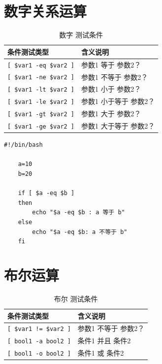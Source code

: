 \documentclass[UTF8,a4paper,12pt]{ctexbook}
\begin{document}
		 \section{数字关系运算}
			\begin{table}[H]
				\centering
				\caption{数字 测试条件}
				\begin{tabular}{p{5cm}<{\centering} | p{10cm}<{\centering}}
					\toprule
						条件测试类型 & 含义说明\\
					\midrule
						\verb|[ $var1 -eq $var2 ]| & 参数1 等于 参数2？\\
						\verb|[ $var1 -ne $var2 ]| & 参数1 不等于 参数2？\\
						\verb|[ $var1 -lt $var2 ]| & 参数1 小于 参数2？\\
						\verb|[ $var1 -le $var2 ]| & 参数1 小于等于 参数2？\\
						\verb|[ $var1 -gt $var2 ]| & 参数1 大于 参数2？\\
						\verb|[ $var1 -ge $var2 ]| & 参数1 大于等于 参数2？\\
					\bottomrule
				\end{tabular}
			\end{table}
					 
			 \begin{lstlisting}[xleftmargin=.06\textwidth]
	#!/bin/bash
	
	a=10
	b=20
	
	if [ $a -eq $b ]
	then
		echo "$a -eq $b : a 等于 b"
	else
		echo "$a -eq $b: a 不等于 b"
	fi
				 \end{lstlisting}
		 
		 \section{布尔运算}
			\begin{table}[H]
				\centering
				\caption{布尔 测试条件}
				\begin{tabular}{p{5cm}<{\centering} | p{10cm}<{\centering}}
					\toprule
						条件测试类型 & 含义说明\\
					\midrule
						\verb|[ $var1 != $var2 ]| & 参数1 不等于 参数2？\\
						\verb|[ bool1 -a bool2 ]| & 条件1 并且  条件2 \\
						\verb|[ bool1 -o bool2 ]| & 条件1 或  条件2\\
					\bottomrule
				\end{tabular}
			\end{table}		 
		 
\end{document}
